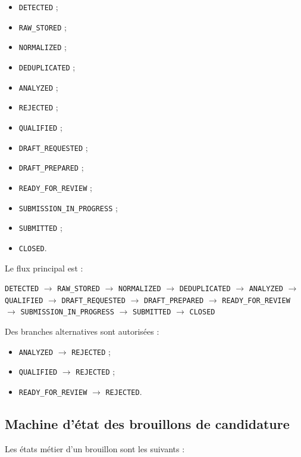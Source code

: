 \documentclass[11pt,a4paper]{article}
\begin{document}
\begin{itemize}
    \item \texttt{DETECTED} ;
    \item \texttt{RAW\_STORED} ;
    \item \texttt{NORMALIZED} ;
    \item \texttt{DEDUPLICATED} ;
    \item \texttt{ANALYZED} ;
    \item \texttt{REJECTED} ;
    \item \texttt{QUALIFIED} ;
    \item \texttt{DRAFT\_REQUESTED} ;
    \item \texttt{DRAFT\_PREPARED} ;
    \item \texttt{READY\_FOR\_REVIEW} ;
    \item \texttt{SUBMISSION\_IN\_PROGRESS} ;
    \item \texttt{SUBMITTED} ;
    \item \texttt{CLOSED}.
\end{itemize}

Le flux principal est :

\begin{center}
\texttt{DETECTED}
$\rightarrow$
\texttt{RAW\_STORED}
$\rightarrow$
\texttt{NORMALIZED}
$\rightarrow$
\texttt{DEDUPLICATED}
$\rightarrow$
\texttt{ANALYZED}
$\rightarrow$
\texttt{QUALIFIED}
$\rightarrow$
\texttt{DRAFT\_REQUESTED}
$\rightarrow$
\texttt{DRAFT\_PREPARED}
$\rightarrow$
\texttt{READY\_FOR\_REVIEW}
$\rightarrow$
\texttt{SUBMISSION\_IN\_PROGRESS}
$\rightarrow$
\texttt{SUBMITTED}
$\rightarrow$
\texttt{CLOSED}
\end{center}

Des branches alternatives sont autorisées :

\begin{itemize}
    \item \texttt{ANALYZED} $\rightarrow$ \texttt{REJECTED} ;
    \item \texttt{QUALIFIED} $\rightarrow$ \texttt{REJECTED} ;
    \item \texttt{READY\_FOR\_REVIEW} $\rightarrow$ \texttt{REJECTED}.
\end{itemize}

\subsection{Machine d’état des brouillons de candidature}

Les états métier d’un brouillon sont les suivants :
\end{document}
